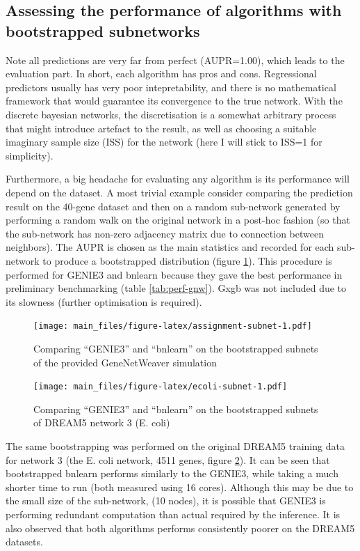 \documentclass[]{article}
\theoremstyle{definition}
\theoremstyle{definition}
\theoremstyle{definition}
\theoremstyle{remark}
\begin{document}
\subsection{Assessing the performance of algorithms with bootstrapped
subnetworks}\label{assessing-the-performance-of-algorithms-with-bootstrapped-subnetworks}

Note all predictions are very far from perfect (AUPR=1.00), which leads
to the evaluation part. In short, each algorithm has pros and cons.
Regressional predictors usually has very poor intepretability, and there
is no mathematical framework that would guarantee its convergence to the
true network. With the discrete bayesian networks, the discretisation is
a somewhat arbitrary process that might introduce artefact to the
result, as well as choosing a suitable imaginary sample size (ISS) for
the network (here I will stick to ISS=1 for simplicity).

Furthermore, a big headache for evaluating any algorithm is its
performance will depend on the dataset. A most trivial example consider
comparing the prediction result on the 40-gene dataset and then on a
random sub-network generated by performing a random walk on the original
network in a post-hoc fashion (so that the sub-network has non-zero
adjacency matrix due to connection between neighbors). The AUPR is
chosen as the main statistics and recorded for each sub-network to
produce a bootstrapped distribution (figure
\ref{fig:assignment-subnet}). This procedure is performed for GENIE3 and
bnlearn because they gave the best performance in preliminary
benchmarking (table \ref{tab:perf-gnw}). Gxgb was not included due to
its slowness (further optimisation is required).

\begin{figure}
\centering
\texttt{[image: main\_files/figure-latex/assignment-subnet-1.pdf]}
\caption{\label{fig:assignment-subnet}Comparing ``GENIE3'' and ``bnlearn''
on the bootstrapped subnets of the provided GeneNetWeaver simulation}
\end{figure}

\begin{figure}
\centering
\texttt{[image: main\_files/figure-latex/ecoli-subnet-1.pdf]}
\caption{\label{fig:ecoli-subnet}Comparing ``GENIE3'' and ``bnlearn'' on the
bootstrapped subnets of DREAM5 network 3 (E. coli)}
\end{figure}

The same bootstrapping was performed on the original DREAM5 training
data for network 3 (the E. coli network, 4511 genes, figure
\ref{fig:ecoli-subnet}). It can be seen that bootstrapped bnlearn
performs similarly to the GENIE3, while taking a much shorter time to
run (both measured using 16 cores). Although this may be due to the
small size of the sub-network, (10 nodes), it is possible that GENIE3 is
performing redundant computation than actual required by the inference.
It is also observed that both algorithms performs consistently poorer on
the DREAM5 datasets.
\end{document}
